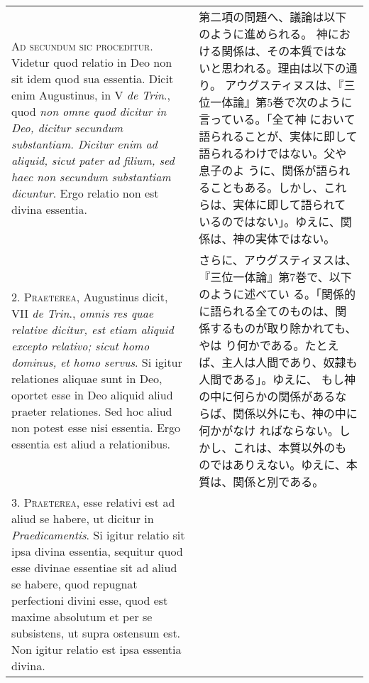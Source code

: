 \documentclass[10pt]{jsarticle} %
\begin{document}
\begin{longtable}{p{21em}p{21em}}





{\Huge A}{\scshape d secundum sic proceditur}. Videtur quod relatio in Deo non sit idem
quod sua essentia. Dicit enim Augustinus, in V {\itshape de Trin}., quod {\itshape non omne
quod dicitur in Deo, dicitur secundum substantiam. Dicitur enim ad
aliquid, sicut pater ad filium, sed haec non secundum substantiam
dicuntur}. Ergo relatio non est divina essentia.


&

第二項の問題へ、議論は以下のように進められる。
神における関係は、その本質ではないと思われる。理由は以下の通り。
アウグスティヌスは、『三位一体論』第5巻で次のように言っている。「全て神
 において語られることが、実体に即して語られるわけではない。父や息子のよ
 うに、関係が語られることもある。しかし、これらは、実体に即して語られて
 いるのではない」。ゆえに、関係は、神の実体ではない。


\\




2. {\scshape Praeterea}, Augustinus dicit, VII {\itshape de Trin}., {\itshape omnis res quae relative
dicitur, est etiam aliquid excepto relativo; sicut homo dominus, et homo
servus}. Si igitur relationes aliquae sunt in Deo, oportet esse in Deo
aliquid aliud praeter relationes. Sed hoc aliud non potest esse nisi
essentia. Ergo essentia est aliud a relationibus.

&

さらに、アウグスティヌスは、『三位一体論』第7巻で、以下のように述べてい
 る。「関係的に語られる全てのものは、関係するものが取り除かれても、やは
 り何かである。たとえば、主人は人間であり、奴隷も人間である」。ゆえに、
 もし神の中に何らかの関係があるならば、関係以外にも、神の中に何かがなけ
 ればならない。しかし、これは、本質以外のものではありえない。ゆえに、本
 質は、関係と別である。



\\



3. {\scshape Praeterea}, esse relativi est ad aliud se habere, ut dicitur in
{\itshape Praedicamentis}. Si igitur relatio sit ipsa divina essentia, sequitur
quod esse divinae essentiae sit ad aliud se habere, quod repugnat
perfectioni divini esse, quod est maxime absolutum et per se subsistens,
ut supra ostensum est. Non igitur relatio est ipsa essentia divina.



\end{longtable}
\end{document}
